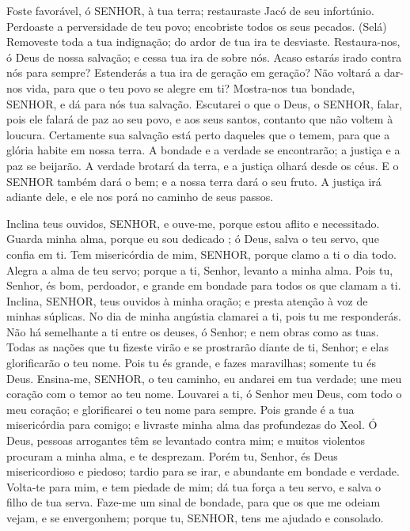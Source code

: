 
{\PP 
  Foste favorável, ó SENHOR, à tua terra; restauraste Jacó de seu infortúnio.
  Perdoaste a perversidade de teu povo; encobriste todos os seus pecados. (Selá)
  Removeste toda a tua indignação; do ardor de tua ira te desviaste.
  Restaura-nos, ó Deus de nossa salvação; e cessa tua ira de sobre nós.
  Acaso estarás irado contra nós para sempre? Estenderás a tua ira de geração em geração?
  Não voltará a dar-nos vida, para que o teu povo se alegre em ti?
  Mostra-nos tua bondade, SENHOR, e dá para nós tua salvação.
  Escutarei o que o Deus, o SENHOR, falar, pois ele falará de paz ao seu povo, e aos seus santos, contanto que não voltem à loucura.
  Certamente sua salvação está perto daqueles que o temem, para que a glória habite em nossa terra.
  A bondade e a verdade se encontrarão; a justiça e a paz se beijarão.
  A verdade brotará da terra, e a justiça olhará desde os céus.
  E o SENHOR também dará o bem; e a nossa terra dará o seu fruto.
  A justiça irá adiante dele, e ele nos porá no caminho de seus passos.
\par }


{\PP 
  Inclina teus ouvidos, SENHOR, e ouve-me, porque estou aflito e necessitado.
  Guarda minha alma, porque eu sou dedicado
{} ; ó Deus, salva o teu servo, que confia em ti.
  Tem misericórdia de mim, SENHOR, porque clamo a ti o dia todo.
  Alegra a alma de teu servo; porque a ti, Senhor, levanto a minha alma.
  Pois tu, Senhor, és bom, perdoador, e grande em bondade para todos os que clamam a ti.
  Inclina, SENHOR, teus ouvidos à minha oração; e presta atenção à voz de minhas súplicas.
  No dia de minha angústia clamarei a ti, pois tu me responderás.
  Não há semelhante a ti entre os deuses, ó Senhor; e nem obras como as tuas.
  Todas as nações que tu fizeste virão e se prostrarão diante de ti, Senhor; e elas glorificarão o teu nome.
  Pois tu és grande, e fazes maravilhas; somente tu és Deus.
  Ensina-me, SENHOR, o teu caminho,
{} eu andarei em tua verdade; une meu coração com o temor ao teu nome.
  Louvarei a ti, ó Senhor meu Deus, com todo o meu coração; e glorificarei o teu nome para sempre.
  Pois grande é a tua misericórdia para comigo; e livraste minha alma das profundezas do Xeol.
  Ó Deus, pessoas arrogantes têm se levantado contra mim; e muitos violentos procuram
{} a minha alma, e te desprezam.
  Porém tu, Senhor, és Deus misericordioso e piedoso; tardio para se irar, e abundante em bondade e verdade.
  Volta-te para mim, e tem piedade de mim; dá tua força a teu servo, e salva o filho de tua serva.
  Faze-me um sinal de bondade, para que os que me odeiam vejam, e se envergonhem; porque tu, SENHOR, tens me ajudado e consolado.
\par }

